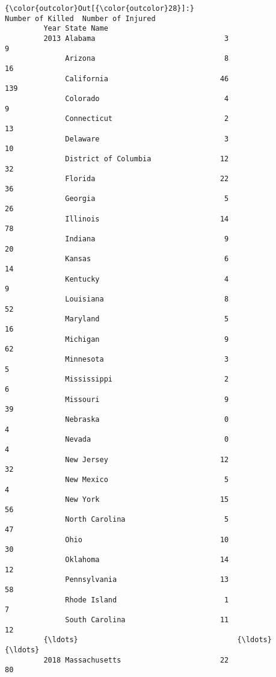 \documentclass[11pt]{article}
\begin{document}
\begin{Verbatim}[commandchars=\\\{\}]
{\color{outcolor}Out[{\color{outcolor}28}]:}                            Number of Killed  Number of Injured
         Year State Name                                               
         2013 Alabama                              3                  9
              Arizona                              8                 16
              California                          46                139
              Colorado                             4                  9
              Connecticut                          2                 13
              Delaware                             3                 10
              District of Columbia                12                 32
              Florida                             22                 36
              Georgia                              5                 26
              Illinois                            14                 78
              Indiana                              9                 20
              Kansas                               6                 14
              Kentucky                             4                  9
              Louisiana                            8                 52
              Maryland                             5                 16
              Michigan                             9                 62
              Minnesota                            3                  5
              Mississippi                          2                  6
              Missouri                             9                 39
              Nebraska                             0                  4
              Nevada                               0                  4
              New Jersey                          12                 32
              New Mexico                           5                  4
              New York                            15                 56
              North Carolina                       5                 47
              Ohio                                10                 30
              Oklahoma                            14                 12
              Pennsylvania                        13                 58
              Rhode Island                         1                  7
              South Carolina                      11                 12
         {\ldots}                                     {\ldots}                {\ldots}
         2018 Massachusetts                       22                 80

\end{Verbatim}
\end{document}
